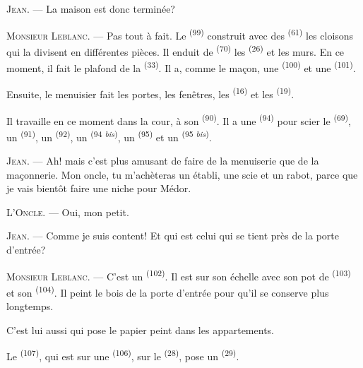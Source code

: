 \textsc{Jean}. --- La maison est donc terminée?

\VUsaut{3.0mm}
\VUsaut{3.0mm}

\textsc{Monsieur Leblanc}. --- Pas tout à fait. Le 
\textsuperscript{(99)} construit avec des 
\textsuperscript{(61)} les cloisons qui la divisent en différentes pièces. Il
enduit de  \textsuperscript{(70)} les 
\textsuperscript{(26)} et les murs. En ce moment, il fait le plafond de la
 \textsuperscript{(33)}. Il a, comme le maçon, une
 \textsuperscript{(100)} et une 
\textsuperscript{(101)}.

Ensuite, le menuisier fait les portes, les fenêtres, les 
\textsuperscript{(16)} et les  \textsuperscript{(19)}.

Il travaille en ce moment dans la cour, à son 
\textsuperscript{(90)}. Il a une  \textsuperscript{(94)} pour
scier le  \textsuperscript{(69)}, un 
\textsuperscript{(91)}, un  \textsuperscript{(92)}, un
 \textsuperscript{(94 \textit{bis})}, un 
\textsuperscript{(95)} et un  \textsuperscript{(95
\textit{bis})}.

\textsc{Jean}. --- Ah! mais c'est plus amusant de faire de la menuiserie que de
la maçonnerie. Mon oncle, tu m'achèteras un établi, une scie et un rabot, parce
que je vais bientôt faire une niche pour Médor.

\textsc{L'Oncle}. --- Oui, mon petit.

\textsc{Jean}. --- Comme je suis content! Et qui est celui qui se tient près de
la porte d'entrée?

\VUsaut{3.0mm}
\VUsaut{3.0mm}

\textsc{Monsieur Leblanc}. --- C'est un 
\textsuperscript{(102)}. Il est sur son échelle avec son pot de
 \textsuperscript{(103)} et son 
\textsuperscript{(104)}. Il peint le bois de la porte d'entrée pour qu'il se
conserve plus longtemps.

C'est lui aussi qui pose le papier peint dans les appartements.

Le  \textsuperscript{(107)}, qui est sur une
 \textsuperscript{(106)}, sur le 
\textsuperscript{(28)}, pose un  \textsuperscript{(29)}.

